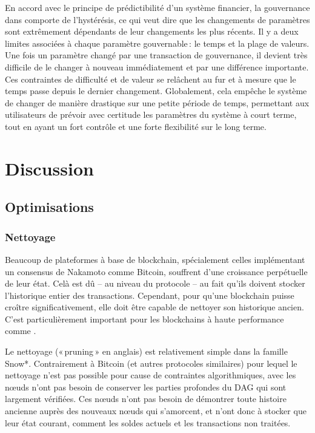 \documentclass[runningheads,francais,a4paper]{llncs}
\begin{document}
En accord avec le principe de prédictibilité d'un système financier, la gouvernance dans \AVATokenName{} comporte de
l'hystérésis, ce qui veut dire que les changements de paramètres sont extrêmement dépendants de leur changements les
plus récents. Il y a deux limites associées à chaque paramètre gouvernable\,: le temps et la plage de valeurs. Une fois
un paramètre changé par une transaction de gouvernance, il devient très difficile de le changer à nouveau immédiatement
et par une différence importante. Ces contraintes de difficulté et de valeur se relâchent au fur et à mesure que le
temps passe depuis le dernier changement. Globalement, cela empêche le système de changer de manière drastique sur une
petite période de temps, permettant aux utilisateurs de prévoir avec certitude les paramètres du système à court terme,
tout en ayant un fort contrôle et une forte flexibilité sur le long terme.

\section{Discussion}
\label{section:discussion}
\subsection{Optimisations}
\subsubsection{Nettoyage}
Beaucoup de plateformes à base de blockchain, spécialement celles implémentant un consensus de Nakamoto comme Bitcoin,
souffrent d'une croissance perpétuelle de leur état. Celà est dû -- au niveau du protocole -- au fait qu'ils doivent
stocker l'historique entier des transactions. Cependant, pour qu'une blockchain puisse croître significativement, elle
doit être capable de nettoyer son historique ancien. C'est particulièrement important pour les blockchains à haute
performance comme \AVAPlatformName{}.

Le nettoyage («\,pruning\,» en anglais) est relativement simple dans la famille Snow*. Contrairement à Bitcoin (et autres
protocoles similaires) pour lequel le nettoyage n'est pas possible pour cause de contraintes algorithmiques, avec
\AVATokenName{} les nœuds n'ont pas besoin de conserver les parties profondes du DAG qui sont largement vérifiées. Ces
nœuds n'ont pas besoin de démontrer toute histoire ancienne auprès des nouveaux nœuds qui s'amorcent, et n'ont donc à
stocker que leur état courant, comment les soldes actuels et les transactions non traitées.
\end{document}
